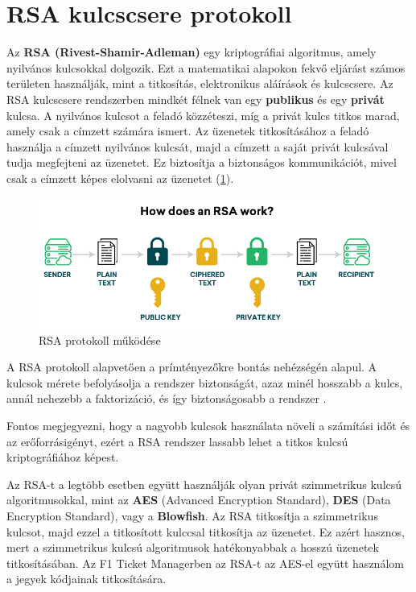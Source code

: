 \section {RSA kulcscsere protokoll}

Az \textbf{RSA (Rivest-Shamir-Adleman)} egy kriptográfiai algoritmus, amely nyilvános kulcsokkal dolgozik. Ezt a matematikai alapokon fekvő eljárást számos területen használják, mint a titkosítás, elektronikus aláírások és kulcscsere. Az RSA kulcscsere rendszerben mindkét félnek van egy \textbf{publikus} és egy \textbf{privát} kulcsa. A nyilvános kulcsot a feladó közzéteszi, míg a privát kulcs titkos marad, amely csak a címzett számára ismert. Az üzenetek titkosításához a feladó használja a címzett nyilvános kulcsát, majd a címzett a saját privát kulcsával tudja megfejteni az üzenetet. Ez biztosítja a biztonságos kommunikációt, mivel csak a címzett képes elolvasni az üzenetet (\ref{abra:rsa}).

\begin{figure}[!h]
	\centering
	\includegraphics[scale=0.4]{images/rsa}
	\caption{RSA protokoll működése}
	\label{abra:rsa}
\end{figure}

A RSA protokoll alapvetően a prímtényezőkre bontás nehézségén alapul. A kulcsok mérete befolyásolja a rendszer biztonságát, azaz minél hosszabb a kulcs, annál nehezebb a faktorizáció, és így biztonságosabb a rendszer \cite{SZTE}.

Fontos megjegyezni, hogy a nagyobb kulcsok használata növeli a számítási időt és az erőforrásigényt, ezért a RSA rendszer lassabb lehet a titkos kulcsú kriptográfiához képest.

Az RSA-t a legtöbb esetben együtt használják olyan privát szimmetrikus kulcsú algoritmusokkal, mint az \textbf{AES} (Advanced Encryption Standard), \textbf{DES} (Data Encryption Standard), vagy a \textbf{Blowfish}. Az RSA titkosítja a szimmetrikus kulcsot, majd ezzel a titkosított kulccsal titkosítja az üzenetet. Ez azért hasznos, mert a szimmetrikus kulcsú algoritmusok hatékonyabbak a hosszú üzenetek titkosításában. Az F1 Ticket Managerben az RSA-t az AES-el együtt használom a jegyek kódjainak titkosítására.


